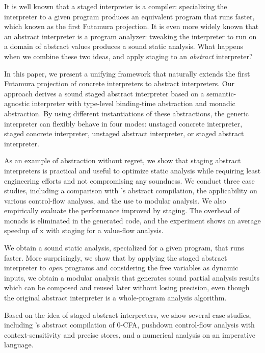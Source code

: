 It is well known that a staged interpreter is a compiler: specializing the
interpreter to a given program produces an equivalent program that runs faster,
which known as the first Futamura projection. It is even more widely known that an
abstract interpreter is a program analyzer: tweaking the interpreter to run on a
domain of abstract values produces a sound static analysis. What happens when we
combine these two ideas, and apply staging to an \emph{abstract} interpreter?

In this paper, we present a unifying framework that naturally extends the first
Futamura projection of concrete interpreters to abstract interpreters. Our
approach derives a sound staged abstract interpreter based on a
semantic-agnostic interpreter with type-level binding-time abstraction and
monadic abstraction. By using different instantiations of these abstractions,
the generic interpreter can flexibly behave in four modes: unstaged concrete
interpreter, staged concrete interpreter, unstaged abstract interpreter, or
staged abstract interpreter.

As an example of abstraction without regret, we show that staging abstract
interpreters is practical and useful to optimize static analysis while requiring
least engineering efforts and not compromising any soundness. We conduct three
case studies, including a comparison with
\citeauthor{Boucher:1996:ACN:647473.727587}'s abstract compilation,
the applicability on various control-flow analyses, and the use to modular
analysis. We also empirically evaluate the performance improved by staging. The
overhead of monads is eliminated in the generated code, and the experiment shows
 an average speedup of x with staging for a value-flow analysis.

\iffalse
We obtain a sound static analysis, specialized for
a given program, that runs faster. More surprisingly, we show that by applying
the staged abstract interpreter to \textit{open} programs and considering the
free variables as dynamic inputs, we obtain a modular analysis that generates
sound partial analysis results which can be composed and reused later without
losing precision, even though the original abstract interpreter is a
whole-program analysis algorithm.

Based on the idea of staged abstract interpreters, we show several case studies,
including \citeauthor{Boucher:1996:ACN:647473.727587}'s abstract compilation of
0-CFA, pushdown control-flow analysis with context-sensitivity and precise
stores, and a numerical analysis on an imperative language.

